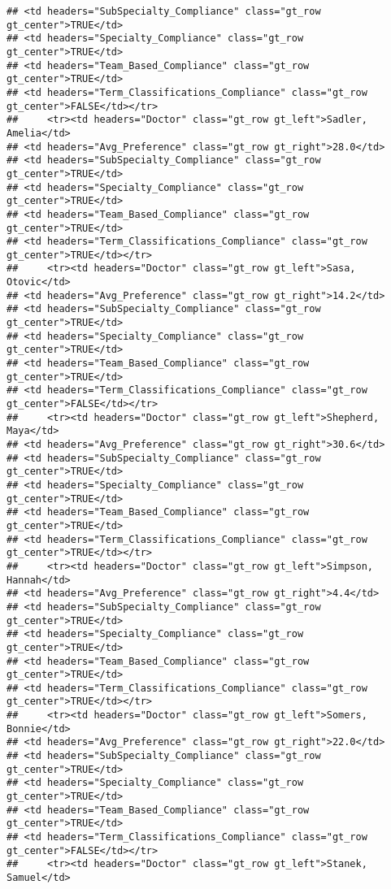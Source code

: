 \documentclass[
]{article}
\begin{document}
\begin{verbatim}
## <td headers="SubSpecialty_Compliance" class="gt_row gt_center">TRUE</td>
## <td headers="Specialty_Compliance" class="gt_row gt_center">TRUE</td>
## <td headers="Team_Based_Compliance" class="gt_row gt_center">TRUE</td>
## <td headers="Term_Classifications_Compliance" class="gt_row gt_center">FALSE</td></tr>
##     <tr><td headers="Doctor" class="gt_row gt_left">Sadler, Amelia</td>
## <td headers="Avg_Preference" class="gt_row gt_right">28.0</td>
## <td headers="SubSpecialty_Compliance" class="gt_row gt_center">TRUE</td>
## <td headers="Specialty_Compliance" class="gt_row gt_center">TRUE</td>
## <td headers="Team_Based_Compliance" class="gt_row gt_center">TRUE</td>
## <td headers="Term_Classifications_Compliance" class="gt_row gt_center">TRUE</td></tr>
##     <tr><td headers="Doctor" class="gt_row gt_left">Sasa, Otovic</td>
## <td headers="Avg_Preference" class="gt_row gt_right">14.2</td>
## <td headers="SubSpecialty_Compliance" class="gt_row gt_center">TRUE</td>
## <td headers="Specialty_Compliance" class="gt_row gt_center">TRUE</td>
## <td headers="Team_Based_Compliance" class="gt_row gt_center">TRUE</td>
## <td headers="Term_Classifications_Compliance" class="gt_row gt_center">FALSE</td></tr>
##     <tr><td headers="Doctor" class="gt_row gt_left">Shepherd, Maya</td>
## <td headers="Avg_Preference" class="gt_row gt_right">30.6</td>
## <td headers="SubSpecialty_Compliance" class="gt_row gt_center">TRUE</td>
## <td headers="Specialty_Compliance" class="gt_row gt_center">TRUE</td>
## <td headers="Team_Based_Compliance" class="gt_row gt_center">TRUE</td>
## <td headers="Term_Classifications_Compliance" class="gt_row gt_center">TRUE</td></tr>
##     <tr><td headers="Doctor" class="gt_row gt_left">Simpson, Hannah</td>
## <td headers="Avg_Preference" class="gt_row gt_right">4.4</td>
## <td headers="SubSpecialty_Compliance" class="gt_row gt_center">TRUE</td>
## <td headers="Specialty_Compliance" class="gt_row gt_center">TRUE</td>
## <td headers="Team_Based_Compliance" class="gt_row gt_center">TRUE</td>
## <td headers="Term_Classifications_Compliance" class="gt_row gt_center">TRUE</td></tr>
##     <tr><td headers="Doctor" class="gt_row gt_left">Somers, Bonnie</td>
## <td headers="Avg_Preference" class="gt_row gt_right">22.0</td>
## <td headers="SubSpecialty_Compliance" class="gt_row gt_center">TRUE</td>
## <td headers="Specialty_Compliance" class="gt_row gt_center">TRUE</td>
## <td headers="Team_Based_Compliance" class="gt_row gt_center">TRUE</td>
## <td headers="Term_Classifications_Compliance" class="gt_row gt_center">FALSE</td></tr>
##     <tr><td headers="Doctor" class="gt_row gt_left">Stanek, Samuel</td>

\end{verbatim}
\end{document}
